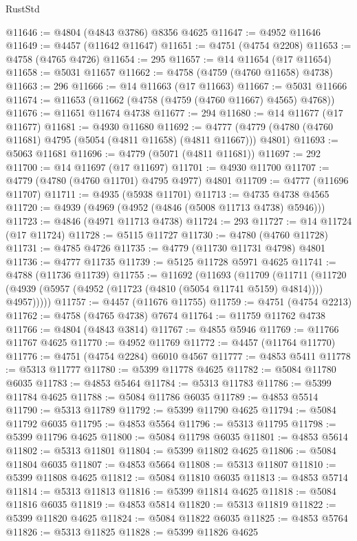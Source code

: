 \begin{lexlean}{RustStd}
\begin{coremodule}
@11646 := @4804 (@4843 @3786) @8356 @4625
@11647 := @4952 @11646
@11649 := @4457 (@11642 @11647)
@11651 := @4751 (@4754 @2208)
@11653 := @4758 (@4765 @4726)
@11654 := 295
@11657 := @14 @11654 (@17 @11654)
@11658 := @5031 @11657
@11662 := @4758 (@4759 (@4760 @11658) @4738)
@11663 := 296
@11666 := @14 @11663 (@17 @11663)
@11667 := @5031 @11666
@11674 := @11653 (@11662 (@4758 (@4759 (@4760 @11667) @4565) @4768))
@11676 := @11651 @11674 @4738
@11677 := 294
@11680 := @14 @11677 (@17 @11677)
@11681 := @4930 @11680
@11692 := @4777 (@4779 (@4780 (@4760 @11681) @4795 (@5054 (@4811 @11658) (@4811 @11667))) @4801)
@11693 := @5063 @11681
@11696 := @4779 (@5071 (@4811 @11681))
@11697 := 292
@11700 := @14 @11697 (@17 @11697)
@11701 := @4930 @11700
@11707 := @4779 (@4780 (@4760 @11701) @4795 @4977) @4801
@11709 := @4777 (@11696 @11707)
@11711 := @4935 (@5938 @11701)
@11713 := @4735 @4738 @4565
@11720 := @4939 (@4969 (@4952 (@4846 (@5008 @11713 @4738) @5946)))
@11723 := @4846 (@4971 @11713 @4738)
@11724 := 293
@11727 := @14 @11724 (@17 @11724)
@11728 := @5115 @11727
@11730 := @4780 (@4760 @11728)
@11731 := @4785 @4726
@11735 := @4779 (@11730 @11731 @4798) @4801
@11736 := @4777 @11735
@11739 := @5125 @11728 @5971 @4625
@11741 := @4788 (@11736 @11739)
@11755 := @11692
    (@11693
      (@11709
        (@11711
          (@11720 (@4939 (@5957 (@4952 (@11723 (@4810 (@5054 @11741 @5159) @4814)))) @4957)))))
@11757 := @4457 (@11676 @11755)
@11759 := @4751 (@4754 @2213)
@11762 := @4758 (@4765 @4738) @7674
@11764 := @11759 @11762 @4738
@11766 := @4804 (@4843 @3814)
@11767 := @4855 @5946
@11769 := @11766 @11767 @4625
@11770 := @4952 @11769
@11772 := @4457 (@11764 @11770)
@11776 := @4751 (@4754 @2284) @6010 @4567
@11777 := @4853 @5411
@11778 := @5313 @11777
@11780 := @5399 @11778 @4625
@11782 := @5084 @11780 @6035
@11783 := @4853 @5464
@11784 := @5313 @11783
@11786 := @5399 @11784 @4625
@11788 := @5084 @11786 @6035
@11789 := @4853 @5514
@11790 := @5313 @11789
@11792 := @5399 @11790 @4625
@11794 := @5084 @11792 @6035
@11795 := @4853 @5564
@11796 := @5313 @11795
@11798 := @5399 @11796 @4625
@11800 := @5084 @11798 @6035
@11801 := @4853 @5614
@11802 := @5313 @11801
@11804 := @5399 @11802 @4625
@11806 := @5084 @11804 @6035
@11807 := @4853 @5664
@11808 := @5313 @11807
@11810 := @5399 @11808 @4625
@11812 := @5084 @11810 @6035
@11813 := @4853 @5714
@11814 := @5313 @11813
@11816 := @5399 @11814 @4625
@11818 := @5084 @11816 @6035
@11819 := @4853 @5814
@11820 := @5313 @11819
@11822 := @5399 @11820 @4625
@11824 := @5084 @11822 @6035
@11825 := @4853 @5764
@11826 := @5313 @11825
@11828 := @5399 @11826 @4625

\end{coremodule}
\end{lexlean}
